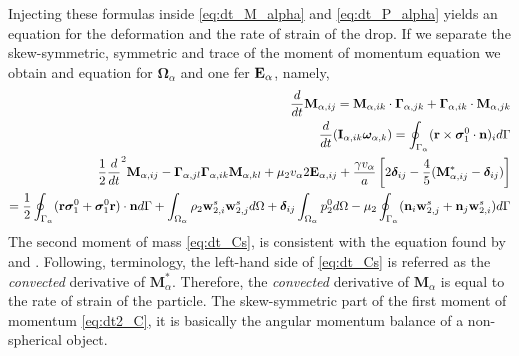 Injecting these formulas inside \ref{eq:dt_M_alpha} and \ref{eq:dt_P_alpha} yields an equation for the deformation and the rate of strain of the drop. 
If we separate the skew-symmetric, symmetric and trace of the moment of momentum equation we obtain and equation for $\bm\Omega_\alpha$ and one fer  $\textbf E_\alpha$, namely,
\begin{align*}
    \frac{d}{dt} \textbf{M}_{\alpha,ij}
    = \textbf{M}_{\alpha,ik} \cdot \bm\Gamma_{\alpha,jk}
    +  \bm\Gamma_{\alpha,ik} \cdot \textbf{M}_{\alpha,jk}\\
    \frac{d}{dt} (\textbf{I}_{\alpha,ik}\bm\omega_{\alpha,k} )
    = 
    \oint_{\Gamma_\alpha} (\textbf{r}\times\bm\sigma_1^0\cdot \textbf{n})_i d\Gamma \\
    \frac{1}{2}\frac{d}{dt}^2 \textbf{M}_{\alpha,ij}
    -  \bm\Gamma_{\alpha,jl}\bm\Gamma_{\alpha,ik} \textbf{M}_{\alpha,kl}  
    + \mu_2 v_\alpha 2\textbf{E}_{\alpha,ij}
    + \frac{\gamma v_\alpha }{a} \left[
    2\bm\delta_{ij} 
    - \frac{4 }{5} (\textbf{M}_{\alpha,ij}^* - \bm\delta_{ij})
    \right]\\
    = 
    \frac{1}{2}\oint_{\Gamma_\alpha} (\textbf{r}\bm\sigma_1^0 + \bm\sigma_1^0\textbf{r})\cdot \textbf{n} d\Gamma 
    + \int_{\Omega_\alpha} \rho_2 \textbf{w}_{2,i}^s\textbf{w}_{2,j}^s d\Omega
    + \bm\delta_{ij}\int_{\Omega_\alpha} p_2^0 d\Omega 
    - \mu_2 \oint_{\Gamma_\alpha} (\textbf{n}_i \textbf{w}_{2,j}^s + \textbf{n}_j \textbf{w}_{2,i}^s) d\Gamma\\
\end{align*}
The second moment of mass \ref{eq:dt_Cs}, is consistent with the equation found by \citet{goddard1967nonlinear} and \citet{lhuillier1987phenomenology}. 
Following, \citet{goddard1967nonlinear}  terminology, the left-hand side of \ref{eq:dt_Cs} is referred as the \textit{convected} derivative of $\textbf{M}^*_\alpha$. 
Therefore, the \textit{convected} derivative of $\textbf{M}_\alpha$ is equal to the rate of strain of the particle. 
The skew-symmetric part of the first moment of momentum \ref{eq:dt2_C}, it is basically the angular momentum balance of a non-spherical object. 
